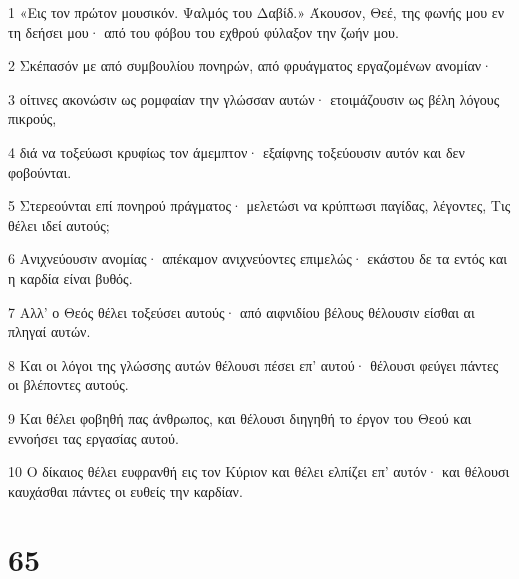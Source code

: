 \par 1 «Εις τον πρώτον μουσικόν. Ψαλμός του Δαβίδ.» Άκουσον, Θεέ, της φωνής μου εν τη δεήσει μου· από του φόβου του εχθρού φύλαξον την ζωήν μου.
\par 2 Σκέπασόν με από συμβουλίου πονηρών, από φρυάγματος εργαζομένων ανομίαν·
\par 3 οίτινες ακονώσιν ως ρομφαίαν την γλώσσαν αυτών· ετοιμάζουσιν ως βέλη λόγους πικρούς,
\par 4 διά να τοξεύωσι κρυφίως τον άμεμπτον· εξαίφνης τοξεύουσιν αυτόν και δεν φοβούνται.
\par 5 Στερεούνται επί πονηρού πράγματος· μελετώσι να κρύπτωσι παγίδας, λέγοντες, Τις θέλει ιδεί αυτούς;
\par 6 Ανιχνεύουσιν ανομίας· απέκαμον ανιχνεύοντες επιμελώς· εκάστου δε τα εντός και η καρδία είναι βυθός.
\par 7 Αλλ' ο Θεός θέλει τοξεύσει αυτούς· από αιφνιδίου βέλους θέλουσιν είσθαι αι πληγαί αυτών.
\par 8 Και οι λόγοι της γλώσσης αυτών θέλουσι πέσει επ' αυτού· θέλουσι φεύγει πάντες οι βλέποντες αυτούς.
\par 9 Και θέλει φοβηθή πας άνθρωπος, και θέλουσι διηγηθή το έργον του Θεού και εννοήσει τας εργασίας αυτού.
\par 10 Ο δίκαιος θέλει ευφρανθή εις τον Κύριον και θέλει ελπίζει επ' αυτόν· και θέλουσι καυχάσθαι πάντες οι ευθείς την καρδίαν.

\chapter{65}

